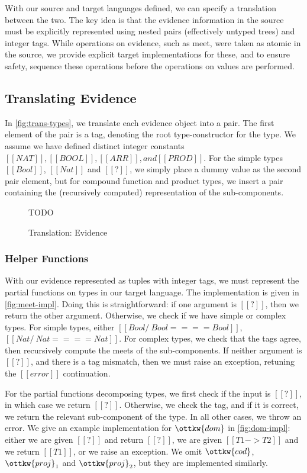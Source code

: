 \documentclass[11pt]{article}
\begin{document}
With our source and target languages defined, we can specify a translation between the two.
The key idea is that the evidence information in the source must be explicitly represented
using nested pairs (effectively untyped trees) and integer tags. While operations on evidence,
such as meet, were taken as atomic in the source, we provide explicit target implementations for these,
and to ensure safety, sequence these operations before the operations on values are performed.

\subsection{Translating Evidence}

In \autoref{fig:trans-types}, we translate each evidence object into a pair.
The first element of the pair is a tag, denoting the root type-constructor for the type.
We assume we have defined distinct integer constants $[[NAT]], [[BOOL]], [[ARR]], and [[PROD]]$.
For the simple types $[[Bool]]$, $[[Nat]]$ and $[[?]]$, we simply place a dummy value as the second pair element,
but for compound function and product types, we insert a pair containing the (recursively computed) representation
of the sub-components. 

\begin{figure}[H] TODO  
	\ottdefnEvTransform
	\caption{Translation: Evidence}
	\label{fig:trans-types}
\end{figure}

\subsubsection{Helper Functions}

With our evidence represented as tuples with integer tags, we must represent the partial functions
on types in our target language.
The implementation is given in \autoref{fig:meet-impl}.
Doing this is straightforward: if one argument is $[[?]]$,
then we return the other argument. Otherwise, we check if we have simple or complex types.
For simple types, either $[[Bool /\ Bool ==== Bool]]$, $[[Nat /\ Nat ==== Nat]]$.
For complex types, we check that the tags agree, then recursively compute the meets of the sub-components.
If neither argument is $[[?]]$, and there is a tag mismatch, then we must raise an exception, retuning the $[[error]]$
continuation.

For the partial functions decomposing types, we first check if the input is $[[?]]$,
in which case we return $[[?]]$. Otherwise, we check the tag, and if it is correct, we return
the relevant sub-component of the type. In all other cases, we throw an error.
We give an example implementation for $\ottkw{dom}$ in \autoref{fig:dom-impl}: either we are given $[[?]]$
and return $[[?]]$, we are given $[[T1 -> T2]]$ and we return $[[T1]]$, or we raise an exception.
We omit $\ottkw{cod}$, $\ottkw{proj}_1$ and $\ottkw{proj}_2$, but they are implemented similarly.
\end{document}
